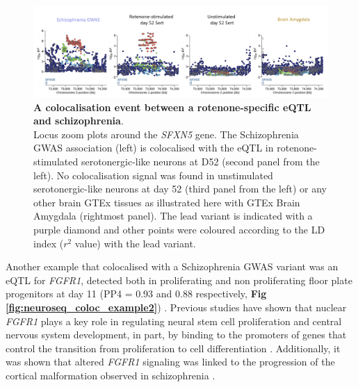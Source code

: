 \begin{figure}[h]
\centering
\includegraphics[width=15.5cm]{Chapter5/Fig/neuroseq_coloc_example1_SFXN5.png}
\caption[First example of colocalisation]{\textbf{A colocalisation event between a rotenone-specific eQTL and schizophrenia}.\\
Locus zoom plots around the \textit{SFXN5} gene. 
The Schizophrenia GWAS association (left) is colocalised with the eQTL in rotenone-stimulated serotonergic-like neurons at D52 (second panel from the left). 
No colocalisation signal was found in unstimulated serotonergic-like neurons at day 52 (third panel from the left) or any other brain GTEx tissues as illustrated here with GTEx Brain Amygdala (rightmost panel). 
The lead variant is indicated with a purple diamond and other points were coloured according to the LD index ($r^2$ value) with the lead variant.}
\label{fig:neuroseq_coloc_example1}
\end{figure}

Another example that colocalised with a Schizophrenia GWAS variant was an eQTL for
\textit{FGFR1}, detected both in proliferating and non proliferating floor plate progenitors at day 11 (PP4 = 0.93 and 0.88 respectively, \textbf{Fig \ref{fig:neuroseq_coloc_example2}}) . 
Previous studies have shown that nuclear \textit{FGFR1} plays a key role in regulating neural stem cell proliferation and central nervous system development, in part, by binding to the promoters of genes that control the transition from proliferation to cell differentiation \cite{ma2009molecular}. 
Additionally, it was shown that altered \textit{FGFR1} signaling was linked to the progression of the cortical malformation observed in schizophrenia \cite{stachowiak2017cerebral}.\\


